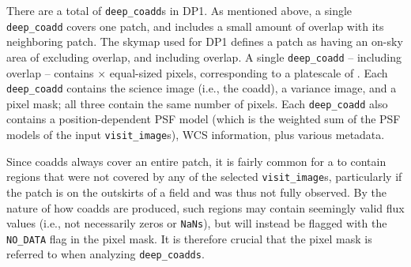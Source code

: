 \begin{itemize}
There are a total of \ndeepcoadds \texttt{deep\_coadd}s in \gls{DP1}.
As mentioned above, a single \texttt{deep\_coadd} covers one \gls{patch}, and includes a small amount of overlap with its neighboring \gls{patch}.
The skymap used for \gls{DP1} defines a \gls{patch} as having an on-sky area of \innerpatcharea excluding overlap, and \outerpatcharea including overlap. A single \texttt{deep\_coadd} -- including overlap -- contains \ndeepcoaddpixx $\times$ \ndeepcoaddpixy equal-sized pixels, corresponding to a platescale of \rawplatescale.
Each \texttt{deep\_coadd} contains the science image (i.e., the coadd), a variance image, and a pixel mask; all three contain the same number of pixels.
Each \texttt{deep\_coadd} also contains a position-dependent \gls{PSF} model (which is the weighted sum of the \gls{PSF} models of the input \texttt{visit\_image}s), \gls{WCS} information, plus various \gls{metadata}.

Since coadds always cover an entire \gls{patch}, it is fairly common for a  to contain regions that were not covered by any of the selected \texttt{visit\_image}s, particularly if the \gls{patch} is on the outskirts of a field and was thus not fully observed. By the nature of how coadds are produced, such regions may contain seemingly valid \gls{flux} values (i.e., not necessarily zeros or \texttt{NaNs}), but will instead be flagged with the \texttt{NO\_DATA} flag in the pixel mask. It is therefore crucial that the pixel mask is referred to when analyzing \texttt{deep\_coadds}.



\end{itemize}
